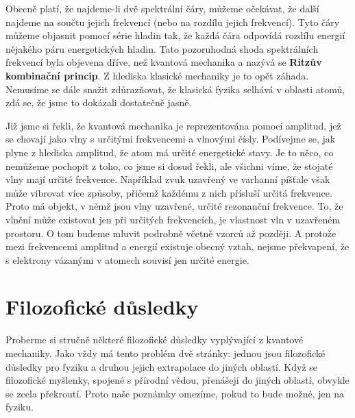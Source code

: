     Obecně platí, že najdeme-li dvě spektrální čáry, můžeme očekávat, že další najdeme na součtu
    jejich frekvencí (nebo na rozdílu jejich frekvencí). Tyto čáry můžeme objasnit pomocí série
    hladin tak, že každá čára odpovídá rozdílu energií nějakého páru energetických hladin. Tato
    pozoruhodná shoda spektrálních frekvencí byla objevena dříve, než kvantová mechanika a nazývá se
    \textbf{Ritzův kombinační princip}. Z hlediska klasické mechaniky je to opět záhada. Nemusíme se
    dále snažit zdůrazňovat, že klasická fyzika selhává v oblasti atomů, zdá se, že jsme to dokázali
    dostatečně jasně.

    Již jsme si řekli, že kvantová mechanika je reprezentována pomocí amplitud, jež se chovají jako
    vlny s určitými frekvencemi a vlnovými čísly. Podívejme se, jak plyne z hlediska amplitud, že
    atom má určité energetické stavy. Je to něco, co nemůžeme pochopit z toho, co jsme si dosud
    řekli, ale všichni víme, že stojaté vlny mají určité frekvence. Například zvuk uzavřený ve
    varhanní píšťale však může vibrovat více způsoby, přičemž každému z nich přísluší určitá
    frekvence. Proto má objekt, v němž jsou vlny uzavřené, určité rezonanční frekvence. To, že
    vlnění může existovat jen při určitých frekvencích, je vlastnost vln v uzavřeném prostoru. O tom
    budeme mluvit podrobně včetně vzorců až později. A protože mezi frekvencemi amplitud a energií
    existuje obecný vztah, nejsme překvapení, že s elektrony vázanými v atomech souvisí jen určité
    energie.

  \section{Filozofické důsledky}\label{fyz:IchapXXXVIIIsecVI}
    Proberme si stručně některé filozofické důsledky vyplývající z kvantové mechaniky. Jako vždy má
    tento problém dvě stránky: jednou jsou filozofické důsledky pro fyziku a druhou jejich extrapolace
    do jiných oblastí. Když se filozofické myšlenky, spojené s přírodní vědou, přenášejí do jiných
    oblastí, obvykle se zcela překroutí. Proto naše poznámky omezíme, pokud to bude možné, jen na
    fyziku. 
    
